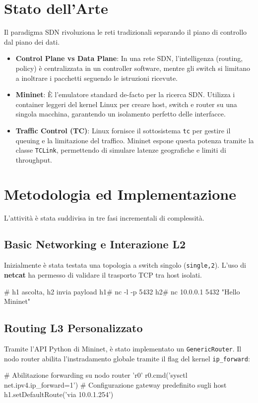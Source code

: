 \documentclass[a4paper,12pt]{article}
\begin{document}
\section{Stato dell'Arte}
Il paradigma SDN rivoluziona le reti tradizionali separando il piano di controllo dal piano dei dati.
\begin{itemize}
    \item \textbf{Control Plane vs Data Plane}: In una rete SDN, l'intelligenza (routing, policy) è centralizzata in un controller software, mentre gli switch si limitano a inoltrare i pacchetti seguendo le istruzioni ricevute.
    \item \textbf{Mininet}: È l'emulatore standard de-facto per la ricerca SDN. Utilizza i container leggeri del kernel Linux per creare host, switch e router su una singola macchina, garantendo un isolamento perfetto delle interfacce.
    \item \textbf{Traffic Control (TC)}: Linux fornisce il sottosistema \texttt{tc} per gestire il queuing e la limitazione del traffico. Mininet espone questa potenza tramite la classe \texttt{TCLink}, permettendo di simulare latenze geografiche e limiti di throughput.
\end{itemize}

\section{Metodologia ed Implementazione}
L'attività è stata suddivisa in tre fasi incrementali di complessità.

\subsection{Basic Networking e Interazione L2}
Inizialmente è stata testata una topologia a switch singolo (\texttt{single,2}). L'uso di \textbf{netcat} ha permesso di validare il trasporto TCP tra host isolati.
\begin{terminal}
# h1 ascolta, h2 invia payload
h1# nc -l -p 5432
h2# nc 10.0.0.1 5432 "Hello Mininet"
\end{terminal}

\subsection{Routing L3 Personalizzato}
Tramite l'API Python di Mininet, è stato implementato un \texttt{GenericRouter}. Il nodo router abilita l'instradamento globale tramite il flag del kernel \texttt{ip_forward}:
\begin{pythoncode}
# Abilitazione forwarding su nodo router 'r0'
r0.cmd('sysctl net.ipv4.ip_forward=1')
# Configurazione gateway predefinito sugli host
h1.setDefaultRoute('via 10.0.1.254')
\end{pythoncode}
\end{document}
